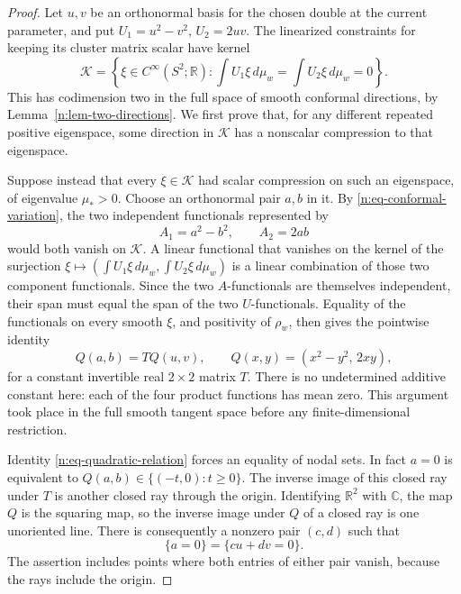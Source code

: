 \begin{proof}
Let \(u,v\) be an orthonormal basis for the chosen double at the
current parameter, and put \(U_1=u^2-v^2\), \(U_2=2uv\).
The linearized constraints for keeping its cluster matrix scalar
have kernel
\begin{equation}\label{n:eq-double-kernel}
 \mathcal K=\left\{\xi\in C^\infty(S^2;\mathbb R):
       \int U_1\xi\,d\mu_w=\int U_2\xi\,d\mu_w=0\right\}.
\end{equation}
This has codimension two in the full space of smooth conformal
directions, by Lemma~\ref{n:lem-two-directions}.  We first prove that,
for any different repeated positive eigenspace, some direction in
\(\mathcal K\) has a nonscalar compression to that eigenspace.

Suppose instead that every \(\xi\in\mathcal K\) had scalar
compression on such an eigenspace, of eigenvalue \(\mu_*>0\).
Choose an orthonormal pair \(a,b\) in it.  By
\eqref{n:eq-conformal-variation}, the two independent functionals
represented by
\[
 A_1=a^2-b^2,\qquad A_2=2ab
\]
would both vanish on \(\mathcal K\).  A linear functional that
vanishes on the kernel of the surjection
\(\xi\mapsto(\int U_1\xi\,d\mu_w,\int U_2\xi\,d\mu_w)\)
is a linear combination of those two component functionals.
Since the two \(A\)-functionals are themselves independent, their
span must equal the span of the two \(U\)-functionals.  Equality of
the functionals on every smooth \(\xi\), and positivity of
\(\rho_w\), then gives the pointwise identity
\begin{equation}\label{n:eq-quadratic-relation}
 Q(a,b)=TQ(u,v),\qquad
 Q(x,y)=(x^2-y^2,\,2xy),
\end{equation}
for a constant invertible real \(2\times2\) matrix \(T\).
There is no undetermined additive constant here: each of the four
product functions has mean zero.  This argument took place in the
full smooth tangent space before any finite-dimensional restriction.

Identity \eqref{n:eq-quadratic-relation} forces an equality of nodal
sets.  In fact \(a=0\) is equivalent to
\(Q(a,b)\in\{(-t,0):t\geq0\}\).  The inverse image of this closed
ray under \(T\) is another closed ray through the origin.  Identifying
\(\mathbb R^2\) with \(\mathbb C\), the map \(Q\) is the squaring map,
so the inverse image under \(Q\) of a closed ray is one unoriented
line.  There is consequently a nonzero pair \((c,d)\) such that
\begin{equation}\label{n:eq-common-nodal-set}
 \{a=0\}=\{cu+dv=0\}.
\end{equation}
The assertion includes points where both entries of either pair
vanish, because the rays include the origin.


\end{proof}
